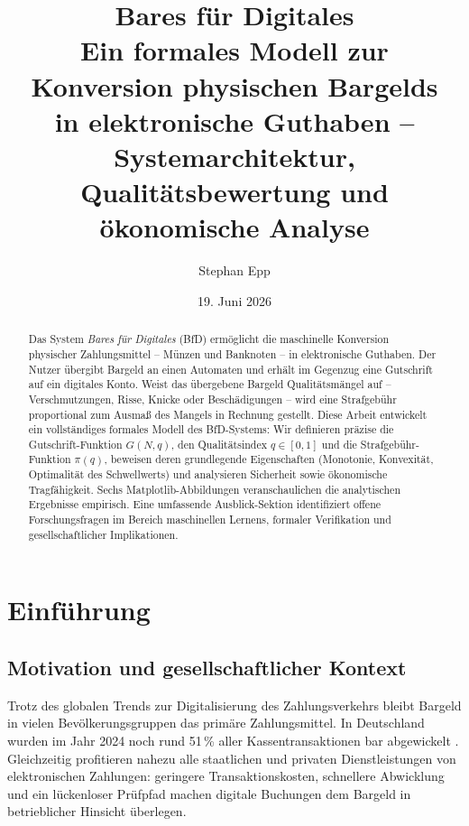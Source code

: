 ﻿\documentclass[a4paper,12pt]{article}
\title{\textbf{Bares für Digitales}\\[0.4em]
\large Ein formales Modell zur Konversion physischen Bargelds\\
in elektronische Guthaben -- Systemarchitektur,\\
Qualitätsbewertung und ökonomische Analyse}
\author{Stephan Epp}
\date{19. Juni 2026}
\theoremstyle{definition}
\begin{document}
\sloppy

\maketitle

\begin{abstract}
Das System \emph{Bares für Digitales} (BfD) ermöglicht die maschinelle Konversion physischer
Zahlungsmittel -- Münzen und Banknoten -- in elektronische Guthaben.
Der Nutzer übergibt Bargeld an einen Automaten und erhält im Gegenzug eine Gutschrift
auf ein digitales Konto.  Weist das übergebene Bargeld Qualitätsmängel auf --
Verschmutzungen, Risse, Knicke oder Beschädigungen -- wird eine Strafgebühr
proportional zum Ausmaß des Mangels in Rechnung gestellt.
Diese Arbeit entwickelt ein vollständiges formales Modell des BfD-Systems:
Wir definieren präzise die Gutschrift-Funktion $G(N, q)$, den Qualitätsindex $q \in [0,1]$
und die Strafgebühr-Funktion $\pi(q)$, beweisen deren grundlegende Eigenschaften (Monotonie,
Konvexität, Optimalität des Schwellwerts) und analysieren Sicherheit sowie ökonomische
Tragfähigkeit.  Sechs Matplotlib-Abbildungen veranschaulichen die analytischen Ergebnisse
empirisch.  Eine umfassende Ausblick-Sektion identifiziert offene Forschungsfragen
im Bereich maschinellen Lernens, formaler Verifikation und gesellschaftlicher Implikationen.
\end{abstract}

\tableofcontents
\newpage

\section{Einführung}

\subsection{Motivation und gesellschaftlicher Kontext}

Trotz des globalen Trends zur Digitalisierung des Zahlungsverkehrs bleibt Bargeld
in vielen Bevölkerungsgruppen das primäre Zahlungsmittel.
In Deutschland wurden im Jahr 2024 noch rund 51\,\% aller Kassentransaktionen bar
abgewickelt \cite{bundesbank2024}.
Gleichzeitig profitieren nahezu alle staatlichen und privaten Dienstleistungen
von elektronischen Zahlungen: geringere Transaktionskosten, schnellere Abwicklung
und ein lückenloser Prüfpfad machen digitale Buchungen dem Bargeld in betrieblicher
Hinsicht überlegen.
\end{document}
